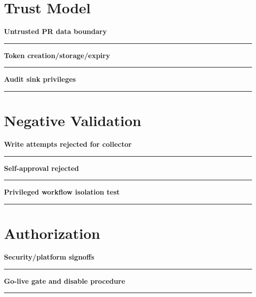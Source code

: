 \documentclass[11pt,letterpaper]{article}
\begin{document}
\section{Trust Model}
\noindent\textbf{Untrusted PR data boundary}\par
\vspace{1.1em}\noindent\rule{0.96\linewidth}{0.4pt}\par\vspace{0.65em}
\noindent\textbf{Token creation/storage/expiry}\par
\vspace{1.1em}\noindent\rule{0.96\linewidth}{0.4pt}\par\vspace{0.65em}
\noindent\textbf{Audit sink privileges}\par
\vspace{1.1em}\noindent\rule{0.96\linewidth}{0.4pt}\par\vspace{0.65em}
\section{Negative Validation}
\noindent\textbf{Write attempts rejected for collector}\par
\vspace{1.1em}\noindent\rule{0.96\linewidth}{0.4pt}\par\vspace{0.65em}
\noindent\textbf{Self-approval rejected}\par
\vspace{1.1em}\noindent\rule{0.96\linewidth}{0.4pt}\par\vspace{0.65em}
\noindent\textbf{Privileged workflow isolation test}\par
\vspace{1.1em}\noindent\rule{0.96\linewidth}{0.4pt}\par\vspace{0.65em}
\section{Authorization}
\noindent\textbf{Security/platform signoffs}\par
\vspace{1.1em}\noindent\rule{0.96\linewidth}{0.4pt}\par\vspace{0.65em}
\noindent\textbf{Go-live gate and disable procedure}\par
\vspace{1.1em}\noindent\rule{0.96\linewidth}{0.4pt}\par\vspace{0.65em}
\end{document}

